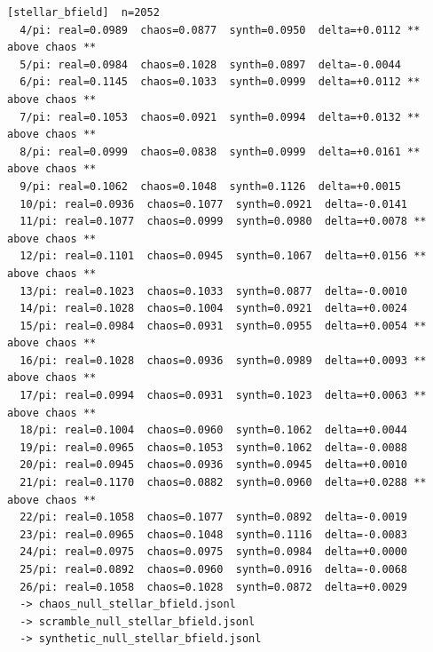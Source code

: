 \documentclass[11pt, letterpaper, openany]{book}
\begin{document}
\begin{empiricalbox}
\begin{lstlisting}[style=terminal]
[stellar_bfield]  n=2052
  4/pi: real=0.0989  chaos=0.0877  synth=0.0950  delta=+0.0112 ** above chaos **
  5/pi: real=0.0984  chaos=0.1028  synth=0.0897  delta=-0.0044
  6/pi: real=0.1145  chaos=0.1033  synth=0.0999  delta=+0.0112 ** above chaos **
  7/pi: real=0.1053  chaos=0.0921  synth=0.0994  delta=+0.0132 ** above chaos **
  8/pi: real=0.0999  chaos=0.0838  synth=0.0999  delta=+0.0161 ** above chaos **
  9/pi: real=0.1062  chaos=0.1048  synth=0.1126  delta=+0.0015
  10/pi: real=0.0936  chaos=0.1077  synth=0.0921  delta=-0.0141
  11/pi: real=0.1077  chaos=0.0999  synth=0.0980  delta=+0.0078 ** above chaos **
  12/pi: real=0.1101  chaos=0.0945  synth=0.1067  delta=+0.0156 ** above chaos **
  13/pi: real=0.1023  chaos=0.1033  synth=0.0877  delta=-0.0010
  14/pi: real=0.1028  chaos=0.1004  synth=0.0921  delta=+0.0024
  15/pi: real=0.0984  chaos=0.0931  synth=0.0955  delta=+0.0054 ** above chaos **
  16/pi: real=0.1028  chaos=0.0936  synth=0.0989  delta=+0.0093 ** above chaos **
  17/pi: real=0.0994  chaos=0.0931  synth=0.1023  delta=+0.0063 ** above chaos **
  18/pi: real=0.1004  chaos=0.0960  synth=0.1062  delta=+0.0044
  19/pi: real=0.0965  chaos=0.1053  synth=0.1062  delta=-0.0088
  20/pi: real=0.0945  chaos=0.0936  synth=0.0945  delta=+0.0010
  21/pi: real=0.1170  chaos=0.0882  synth=0.0960  delta=+0.0288 ** above chaos **
  22/pi: real=0.1058  chaos=0.1077  synth=0.0892  delta=-0.0019
  23/pi: real=0.0965  chaos=0.1048  synth=0.1116  delta=-0.0083
  24/pi: real=0.0975  chaos=0.0975  synth=0.0984  delta=+0.0000
  25/pi: real=0.0892  chaos=0.0960  synth=0.0916  delta=-0.0068
  26/pi: real=0.1058  chaos=0.1028  synth=0.0872  delta=+0.0029
  -> chaos_null_stellar_bfield.jsonl
  -> scramble_null_stellar_bfield.jsonl
  -> synthetic_null_stellar_bfield.jsonl


\end{lstlisting}
\end{empiricalbox}
\end{document}
